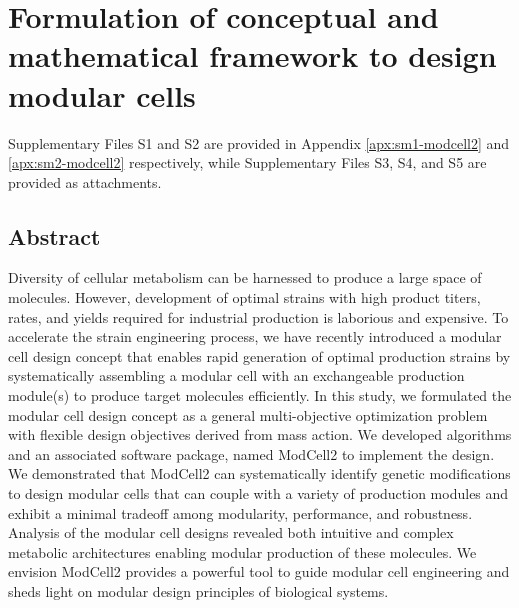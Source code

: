 \chapter{Formulation of conceptual and mathematical framework to design modular cells}\label{ch:modcell2}

Supplementary Files S1 and S2 are provided in Appendix \ref{apx:sm1-modcell2} and \ref{apx:sm2-modcell2} respectively, while Supplementary Files S3, S4, and S5 are provided as attachments.


\section*{Abstract}\label{abstract}

Diversity of cellular metabolism can be harnessed to produce a large space of molecules.
However, development of optimal strains with high product titers, rates, and yields required for industrial production is laborious and expensive.
To accelerate the strain engineering process, we have recently introduced a modular cell design concept that enables rapid generation of optimal production strains by systematically assembling a modular cell with an exchangeable production module(s) to produce target molecules efficiently.
In this study, we formulated the modular cell design concept as a general multi-objective optimization problem with flexible design objectives derived from mass action.
We developed algorithms and an associated software package, named ModCell2 to implement the design.
We demonstrated that ModCell2 can systematically identify genetic modifications to design modular cells that can couple with a variety of production modules and exhibit a minimal tradeoff among modularity, performance, and robustness.
Analysis of the modular cell designs revealed both intuitive and complex metabolic architectures enabling modular production of these molecules.
We envision ModCell2 provides a powerful tool to guide modular cell engineering and sheds light on modular design principles of biological systems.

%
%

